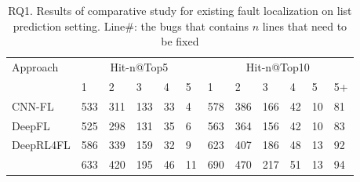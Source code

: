 \begin{table}[h]
	\caption{RQ1. Results of comparative study for existing fault localization on list prediction setting. Line$\#$: the bugs that contains $n$ lines that need to be fixed}
	{\small
		\begin{center}
			\renewcommand{\arraystretch}{1}
			\begin{tabular}{p{1.5cm}<{\centering}|p{0.3cm}<{\centering}|p{0.3cm}<{\centering}|p{0.3cm}<{\centering}|p{0.2cm}<{\centering}|p{0.2cm}<{\centering}|p{0.3cm}<{\centering}|p{0.3cm}<{\centering}|p{0.3cm}<{\centering}|p{0.2cm}<{\centering}|p{0.2cm}<{\centering}|p{0.2cm}<{\centering}}
				\hline
				\multirow{2}{*}{Approach}    & \multicolumn{5}{c|}{Hit-n@Top5}& \multicolumn{6}{c}{Hit-n@Top10}\\
				\cline{2-12}
											 &1&2&3&4&5&1&2&3&4&5&5+\\
				
				\hline
				CNN-FL      & 533 & 311 & 133 & 33 & 4 & 578 & 386 & 166 & 42 & 10 & 81 \\
				DeepFL		& 525 & 298 & 131 & 35 & 6 & 563 & 364 & 156 & 42 & 10 & 83 \\
				DeepRL4FL	& 586 & 339 & 159 & 32 & 9 & 623 & 407 & 186 & 48 & 13 & 92 \\
				\hline
				\tool       & 633 & 420 & 195 & 46 & 11& 690 & 470 & 217 & 51 & 13 & 94 \\
				\hline
			\end{tabular}
			
			\label{fig:rq1-2}
		\end{center}
	}
\end{table}
